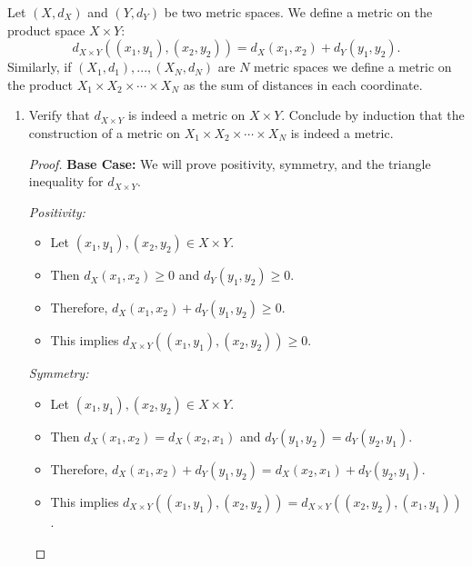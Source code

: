 \documentclass[10pt]{article}
\newenvironment{problem}[2][Problem]{\begin{trivlist}
\item[\hskip \labelsep {\bfseries #1}\hskip \labelsep {\bfseries #2.}]}{\end{trivlist}}
\begin{document}
\begin{problem}{3}
	Let $ (X,d_X) $ and $ (Y,d_Y) $ be two metric spaces. We define a metric on the product space $ X \times Y $:
	\[ d_{X\times Y}((x_1,y_1),(x_2,y_2)) = d_X(x_1,x_2)+d_Y(y_1,y_2). \]
	Similarly, if $ (X_1,d_1),...,(X_N,d_N) $ are $ N $ metric spaces we define a metric on the product $ X_1 \times X_2 \times \cdots \times X_N $ as the sum of distances in each coordinate.
	\begin{enumerate}
		\item Verify that $ d_{X \times Y} $ is indeed a metric on $ X \times Y $. Conclude by induction that the construction of a metric on $ X_1 \times X_2 \times \cdots \times X_N $ is indeed a metric.
            \begin{proof}
                \textbf{Base Case:}
                We will prove positivity, symmetry, and the triangle inequality for $d_{X \times Y}$.

                \textit{Positivity:}
                \begin{itemize}
                    \item Let $(x_1, y_1), (x_2, y_2) \in X \times Y$.
                    \item Then $d_X(x_1, x_2) \geq 0$ and $d_Y(y_1, y_2) \geq 0$.
                    \item Therefore, $d_X(x_1, x_2) + d_Y(y_1, y_2) \geq 0$.
                    \item This implies $d_{X \times Y}((x_1, y_1), (x_2, y_2)) \geq 0$.
                \end{itemize}
                
                \textit{Symmetry:}
                \begin{itemize}
                    \item Let $(x_1, y_1), (x_2, y_2) \in X \times Y$.
                    \item Then $d_X(x_1, x_2) = d_X(x_2, x_1)$ and $d_Y(y_1, y_2) = d_Y(y_2, y_1)$.
                    \item Therefore, $d_X(x_1, x_2) + d_Y(y_1, y_2) = d_X(x_2, x_1) + d_Y(y_2, y_1)$.
                    \item This implies $d_{X \times Y}((x_1, y_1), (x_2, y_2)) = d_{X \times Y}((x_2, y_2), (x_1, y_1))$.
                \end{itemize}
                

\end{proof}
\end{enumerate}
\end{problem}
\end{document}
